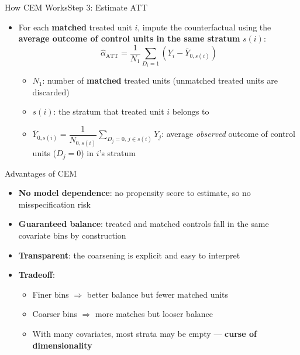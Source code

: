 \documentclass[dvipsnames,hyperref={pdfpagelabels=false}]{beamer}
\begin{document}
\begin{frame}{How CEM Works}{Step 3: Estimate ATT}
\begin{itemize}
    \item[3] For each \textbf{matched} treated unit $i$, impute the
    counterfactual using the \textbf{average outcome of control units
    in the same stratum} $s(i)$:
    \begin{equation*}
        \hat{\alpha}_{\text{ATT}} =
        \dfrac{1}{N_1}\sum_{D_i=1}\!\left(Y_i -
        \bar{Y}_{0,s(i)}\right)
    \end{equation*}
    \begin{itemize}
        \item $N_1$: number of \textbf{matched} treated units
        (unmatched treated units are discarded)
        \vspace{0.2cm}
        \item $s(i)$: the stratum that treated unit $i$ belongs to
        \vspace{0.2cm}
        \item $\bar{Y}_{0,s(i)} =
        \dfrac{1}{N_{0,s(i)}}\!\displaystyle\sum_{D_j=0,\,j\in
        s(i)}\!Y_j$: average \emph{observed} outcome of control
        units ($D_j=0$) in $i$'s stratum
    \end{itemize}
\end{itemize}
\end{frame}


\begin{frame}{Advantages of CEM}
\begin{itemize}
    \item \textbf{No model dependence}: no propensity score to
    estimate, so no misspecification risk
    \vspace{0.2cm}
    \item \textbf{Guaranteed balance}: treated and matched controls
    fall in the same covariate bins by construction
    \vspace{0.2cm}
    \item \textbf{Transparent}: the coarsening is explicit and
    easy to interpret
    \vspace{0.2cm}
    \item \textbf{Tradeoff}:
    \vspace{0.2cm}
    \begin{itemize}
        \item Finer bins $\Rightarrow$ better balance but fewer
        matched units
        \vspace{0.2cm}
        \item Coarser bins $\Rightarrow$ more matches but looser
        balance
        \vspace{0.2cm}
        \item With many covariates, most strata may be empty ---
        \textbf{curse of dimensionality}
    \end{itemize}
\end{itemize}
\end{frame}
\end{document}
